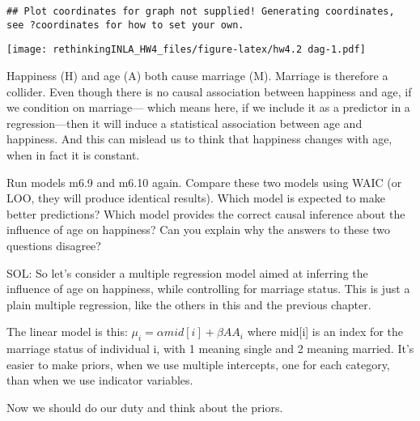 \documentclass[
]{article}
\begin{document}
\begin{verbatim}
## Plot coordinates for graph not supplied! Generating coordinates, see ?coordinates for how to set your own.
\end{verbatim}

\texttt{[image: rethinkingINLA\_HW4\_files/figure-latex/hw4.2 dag-1.pdf]}

Happiness (H) and age (A) both cause marriage (M). Marriage is therefore
a collider. Even though there is no causal association between happiness
and age, if we condition on marriage--- which means here, if we include
it as a predictor in a regression---then it will induce a statistical
association between age and happiness. And this can mislead us to think
that happiness changes with age, when in fact it is constant.

Run models m6.9 and m6.10 again. Compare these two models using WAIC (or
LOO, they will produce identical results). Which model is expected to
make better predictions? Which model provides the correct causal
inference about the influence of age on happiness? Can you explain why
the answers to these two questions disagree?

SOL: So let's consider a multiple regression model aimed at inferring
the influence of age on happiness, while controlling for marriage
status. This is just a plain multiple regression, like the others in
this and the previous chapter.

The linear model is this: \(\mu_i= \alpha mid[i] + \beta AA_i\) where
mid{[}i{]} is an index for the marriage status of individual i, with 1
meaning single and 2 meaning married. It's easier to make priors, when
we use multiple intercepts, one for each category, than when we use
indicator variables.

Now we should do our duty and think about the priors.
\end{document}
